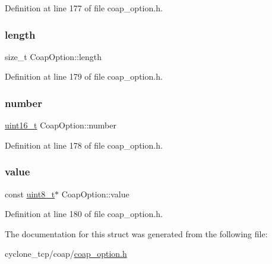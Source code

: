 Definition at line 177 of file coap\+\_\+option.\+h.

\mbox{\label{structCoapOption_a00ae0190c8ea853add596ed817f912f4}} 
\subsubsection{\texorpdfstring{length}{length}}
{\footnotesize\ttfamily size\+\_\+t Coap\+Option\+::length}



Definition at line 179 of file coap\+\_\+option.\+h.

\mbox{\label{structCoapOption_a4930b03666d0b61415ce56e7f8b28246}} 
\subsubsection{\texorpdfstring{number}{number}}
{\footnotesize\ttfamily \hyperlink{stdint_8h_a273cf69d639a59973b6019625df33e30}{uint16\+\_\+t} Coap\+Option\+::number}



Definition at line 178 of file coap\+\_\+option.\+h.

\mbox{\label{structCoapOption_ac57cd3a56c1d18248b7f6d3a5a827aeb}} 
\subsubsection{\texorpdfstring{value}{value}}
{\footnotesize\ttfamily const \hyperlink{stdint_8h_aba7bc1797add20fe3efdf37ced1182c5}{uint8\+\_\+t}$\ast$ Coap\+Option\+::value}



Definition at line 180 of file coap\+\_\+option.\+h.



The documentation for this struct was generated from the following file\+:\begin{DoxyCompactItemize}
\item 
cyclone\+\_\+tcp/coap/\hyperlink{coap__option_8h}{coap\+\_\+option.\+h}\end{DoxyCompactItemize}
